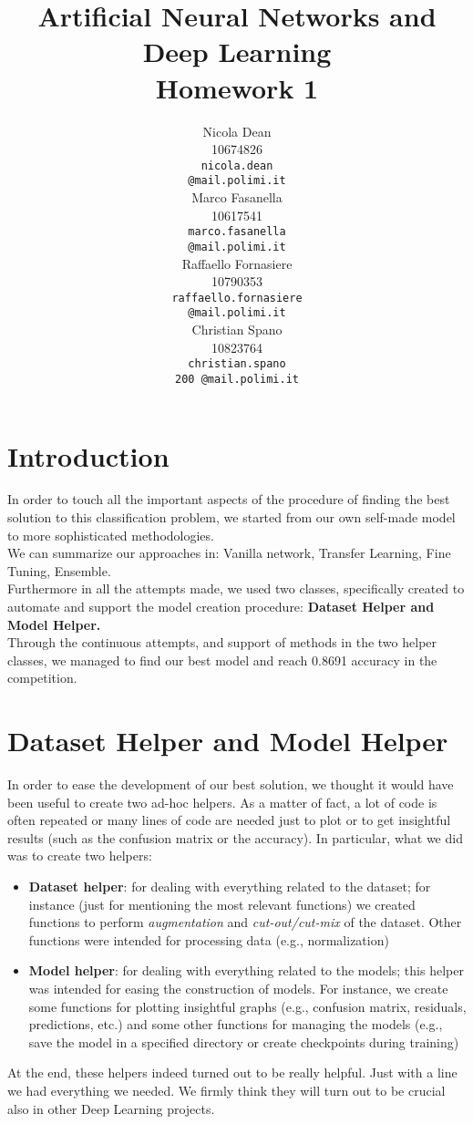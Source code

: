 \documentclass[11pt]{article}
\title{Artificial Neural Networks and Deep Learning \\
Homework 1}
\author{
  Nicola Dean \\
  10674826 \\
  {\tt nicola.dean \\
  \tt @mail.polimi.it} \\\And
  Marco Fasanella \\
  10617541 \\
  {\tt marco.fasanella \\
  \tt @mail.polimi.it} \\\And
  Raffaello Fornasiere \\
    10790353 \\
    {\tt raffaello.fornasiere \\
    \tt @mail.polimi.it} \\\And
  Christian Spano \\
  10823764 \\
  {\tt christian.spano \\200
  \tt @mail.polimi.it} \\}
\date{}
\begin{document}
\maketitle



\section{Introduction}
In order to touch all the important aspects of the procedure of finding the best solution to this classification problem,
we started from our own self-made model to more sophisticated methodologies.\\
 We can summarize our approaches in: Vanilla network, Transfer Learning, Fine Tuning, Ensemble.\\
Furthermore in all the attempts made, we used two classes, specifically created to automate and support the model creation
procedure: \textbf{Dataset Helper and Model Helper.}\\
Through the continuous attempts, and support of methods in the two helper classes, we managed to find our best model and
reach 0.8691 accuracy in the competition.


\section{Dataset Helper and Model Helper}
In order to ease the development of our best solution, we thought it would have been useful to create two ad-hoc helpers. As a matter of fact, a lot of code is often repeated or many lines of code are needed just to plot or to get insightful results (such as the confusion matrix or the accuracy). In particular, what we did was to create two helpers:
\begin{itemize}
    \item \textbf{Dataset helper}: for dealing with everything related to the dataset; for instance (just for mentioning the most relevant functions) we created functions to perform \textit{augmentation} and \textit{cut-out/cut-mix} of the dataset. Other functions were intended for processing data (e.g., normalization)
    \item \textbf{Model helper}: for dealing with everything related to the models; this helper was intended for easing the construction of models. For instance, we create some functions for plotting insightful graphs (e.g., confusion matrix, residuals, predictions, etc.) and some other functions for managing the models (e.g., save the model in a specified directory or create checkpoints during training)
\end{itemize}
At the end, these helpers indeed turned out to be really helpful. Just with a line we had everything we needed. We firmly think they will turn out to be crucial also in other Deep Learning projects.
\end{document}
